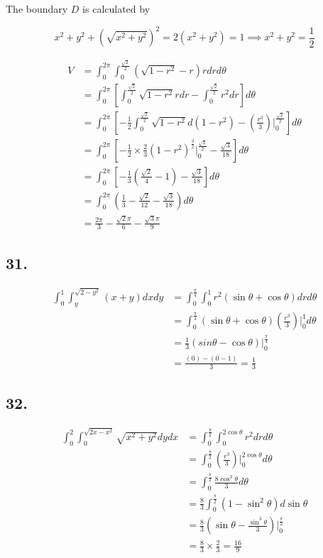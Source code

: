 \documentclass{article}
\begin{document}
  The boundary $D$ is calculated by

  $$x^2 + y^2 + (\sqrt{x^2+y^2})^2 = 2(x^2+y^2) = 1 \implies x^2 + y^2 = \frac 1 2$$

  $$\begin{aligned}
    V &= \int_0^{2\pi} \int_0^{\frac{\sqrt 2}{2}} (\sqrt{1-r^2} - r) r dr d\theta \\
    &= \int_0^{2\pi} [\int_0^{\frac{\sqrt 2}{2}} \sqrt{1-r^2}rdr - \int_0^{\frac{\sqrt 2}{2}} r^2dr] d\theta \\
    &= \int_0^{2\pi} [-\frac 1 2 \int_0^{\frac{\sqrt 2}{2}}\sqrt{1-r^2}d(1-r^2) - (\frac{r^3}{3})\biggl|_0^{\frac{\sqrt 2}{2}}] d\theta \\
    &= \int_0^{2\pi} [-\frac 1 2 \times \frac 2 3 (1-r^2)^{\frac 3 2}\biggl|_{0}^{\frac{\sqrt{2}}{2}} - \frac{\sqrt 3}{18}]d\theta \\
    &= \int_0^{2\pi} [-\frac 1 3 (\frac{\sqrt 2}{4}-1) - \frac{\sqrt 3}{18}] d\theta \\
    &= \int_0^{2\pi} (\frac 1 3 - \frac{\sqrt 2}{12} - \frac{\sqrt 3}{18}) d\theta \\
    &= \frac{2\pi}{3} - \frac{\sqrt 2 \pi}{6} - \frac{\sqrt 3 \pi}{9}
  \end{aligned}$$

  \subsection*{31. }

  $$\begin{aligned}
    \int_0^1 \int_y^{\sqrt{2-y^2}} (x+y) dx dy &= \int_0^{\frac \pi 4} \int_0^1 r^2(\sin \theta + \cos \theta) dr d\theta \\
    &= \int_0^{\frac \pi 4} (\sin \theta + \cos \theta) (\frac{r^3}{3})\biggl|_0^1 d\theta \\
    &= \frac 1 3 (sin \theta -\cos \theta)\biggl|_0^{\frac \pi 4} \\
    &= \frac{(0) - (0 - 1)}{3} = \frac 1 3
  \end{aligned}$$

  \subsection*{32. }

  $$\begin{aligned}
    \int_0^2 \int_0^{\sqrt{2x-x^2}} \sqrt{x^2+y^2} dy dx &= \int_0^{\frac \pi 2} \int_0^{2\cos \theta} r^2 dr d\theta \\
    &= \int_0^{\frac \pi 2} (\frac{r^3}{3})\biggl|_{0}^{2\cos \theta} d\theta \\
    &= \int_0^{\frac \pi 2} \frac{8\cos^3 \theta}{3} d\theta \\
    &= \frac 8 3 \int_0^{\frac \pi 2} (1-\sin^2 \theta) d \sin \theta \\
    &= \frac 8 3 (\sin \theta - \frac{\sin^3 \theta}{3})\biggl|_0^{\frac \pi 2} \\
    &= \frac 8 3 \times \frac 2 3 = \frac{16}{9}
  \end{aligned}$$
\end{document}
